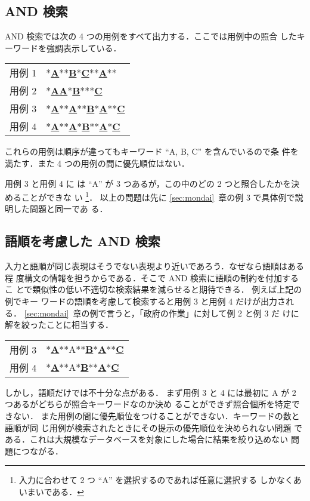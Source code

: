 \subsection{AND 検索}
AND 検索では次の 4 つの用例をすべて出力する．ここでは用例中の照合
したキーワードを強調表示している．
\begin{center}
\begin{tabular}{ll}
用例 1 & *\underline{\bf A}**\underline{\bf B}*\underline{\bf C}**\underline{\bf A}**\\
用例 2 & *\underline{\bf AA}*\underline{\bf B}***\underline{\bf C}\\
用例 3 & *\underline{\bf A}**\underline{\bf A}**\underline{\bf B}*\underline{\bf A}**\underline{\bf C}\\
用例 4 & *\underline{\bf A}**\underline{\bf A}*\underline{\bf B}**\underline{\bf A}*\underline{\bf C}
\end{tabular}
\end{center}

これらの用例は順序が違ってもキーワード ``A, B, C'' を含んでいるので条
件を満たす．また 4 つの用例の間に優先順位はない．

用例 3 と用例 4 に
は ``A'' が 3 つあるが，この中のどの 2 つと照合したかを決めることができな
い
\footnote{入力に合わせて 2 つ ``A'' を選択するのであれば任意に選択する
しかなくあいまいである．}．
以上の問題は先に \ref{sec:mondai}~章の例 3 で具体例で説明した問題と同一であ
る．

\subsection{語順を考慮した AND 検索}
入力と語順が同じ表現はそうでない表現より近いであろう．なぜなら語順はある程
度構文の情報を担うからである．そこで AND 検索に語順の制約を付加するこ
とで類似性の低い不適切な検索結果を減らせると期待できる．
例えば上記の例でキー
ワードの語順を考慮して検索すると用例 3 と用例 4 だけが出力される．
\ref{sec:mondai}~章の例で言うと，「政府の作業」に対して例 2 と例 3 だ
けに解を絞ったことに相当する．
\begin{center}
\begin{tabular}{ll}
用例 3 & *\underline{\bf A}**A**\underline{\bf B}*\underline{\bf A}**\underline{\bf C}\\
用例 4 & *\underline{\bf A}**A*\underline{\bf B}**\underline{\bf A}*\underline{\bf C}
\end{tabular}
\end{center}
しかし，語順だけでは不十分な点がある．
まず用例 3 と 4 には最初に A が 2 つあるがどちらが照合キーワードなのか決め
ることができず照合個所を特定できない．
また用例の間に優先順位をつけることができない．キーワードの数と語順が同
じ用例が検索されたときにその提示の優先順位を決められない問題
である．これは大規模なデータベースを対象にした場合に結果を絞り込めない
問題につながる．
